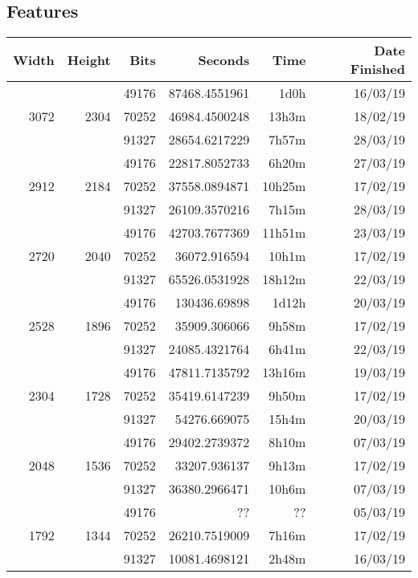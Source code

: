 \subsection{Features}
  \begin{center}
  \begin{tabular}{ r r r | r r r }
  Width & Height & Bits & Seconds & Time & Date Finished \\ \hline
  \multirow{3}{*}{3072} & \multirow{3}{*}{2304} & 49176 & 87468.4551961 & 1d0h & 16/03/19 \\
  & & 70252 & 46984.4500248 & 13h3m & 18/02/19 \\
  & & 91327 & 28654.6217229 & 7h57m & 28/03/19 \\
  \hline
  \multirow{3}{*}{2912} & \multirow{3}{*}{2184} & 49176 & 22817.8052733 & 6h20m & 27/03/19 \\
  & & 70252 & 37558.0894871 & 10h25m & 17/02/19 \\
  & & 91327 & 26109.3570216 & 7h15m & 28/03/19 \\
  \hline
  \multirow{3}{*}{2720} & \multirow{3}{*}{2040} & 49176 & 42703.7677369 & 11h51m & 23/03/19 \\
  & & 70252 & 36072.916594 & 10h1m & 17/02/19 \\
  & & 91327 & 65526.0531928 & 18h12m & 22/03/19 \\
  \hline
  \multirow{3}{*}{2528} & \multirow{3}{*}{1896} & 49176 & 130436.69898 & 1d12h & 20/03/19 \\
  & & 70252 & 35909.306066 & 9h58m & 17/02/19 \\
  & & 91327 & 24085.4321764 & 6h41m & 22/03/19 \\
  \hline
  \multirow{3}{*}{2304} & \multirow{3}{*}{1728} & 49176 & 47811.7135792 & 13h16m & 19/03/19 \\
  & & 70252 & 35419.6147239 & 9h50m & 17/02/19 \\
  & & 91327 & 54276.669075 & 15h4m & 20/03/19 \\
  \hline
  \multirow{3}{*}{2048} & \multirow{3}{*}{1536} & 49176 & 29402.2739372 & 8h10m & 07/03/19 \\
  & & 70252 & 33207.936137 & 9h13m & 17/02/19 \\
  & & 91327 & 36380.2966471 & 10h6m & 07/03/19 \\
  \hline
  \multirow{3}{*}{1792} & \multirow{3}{*}{1344} & 49176 & ?? & ?? & 05/03/19 \\ %
  & & 70252 & 26210.7519009 & 7h16m & 17/02/19 \\
  & & 91327 & 10081.4698121 & 2h48m & 16/03/19 \\

\end{tabular}
\end{center}
